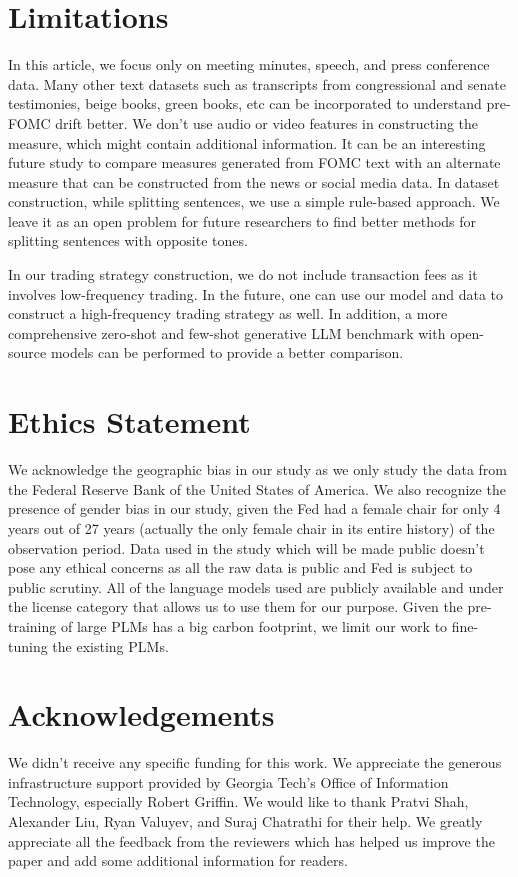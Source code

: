 \documentclass[11pt]{article}
\begin{document}
\section*{Limitations}
In this article, we focus only on meeting minutes, speech, and press conference data. Many other text datasets such as transcripts from congressional and senate testimonies, beige books, green books, etc can be incorporated to understand pre-FOMC drift better. We don't use audio or video features in constructing the measure, which might contain additional information. It can be an interesting future study to compare measures generated from FOMC text with an alternate measure that can be constructed from the news or social media data. In dataset construction, while splitting sentences, we use a simple rule-based approach. We leave it as an open problem for future researchers to find better methods for splitting sentences with opposite tones. 

In our trading strategy construction, we do not include transaction fees as it involves low-frequency trading. In the future, one can use our model and data to construct a high-frequency trading strategy as well. In addition, a more comprehensive zero-shot and few-shot generative LLM benchmark with open-source models can be performed to provide a better comparison. 

\section*{Ethics Statement}
We acknowledge the geographic bias in our study as we only study the data from the Federal Reserve Bank of the United States of America. We also recognize the presence of gender bias in our study, given the Fed had a female chair for only 4 years out of 27 years (actually the only female chair in its entire history) of the observation period. Data used in the study which will be made public doesn't pose any ethical concerns as all the raw data is public and Fed is subject to public scrutiny. All of the language models used are publicly available and under the license category that allows us to use them for our purpose. Given the pre-training of large PLMs has a big carbon footprint, we limit our work to fine-tuning the existing PLMs. 

\section*{Acknowledgements}
We didn't receive any specific funding for this work. We appreciate the generous infrastructure support provided by Georgia Tech's Office of Information Technology, especially Robert Griffin. We would like to thank Pratvi Shah, Alexander Liu, Ryan Valuyev, and Suraj Chatrathi for their help. We greatly appreciate all the feedback from the reviewers which has helped us improve the paper and add some additional information for readers. 
\end{document}
